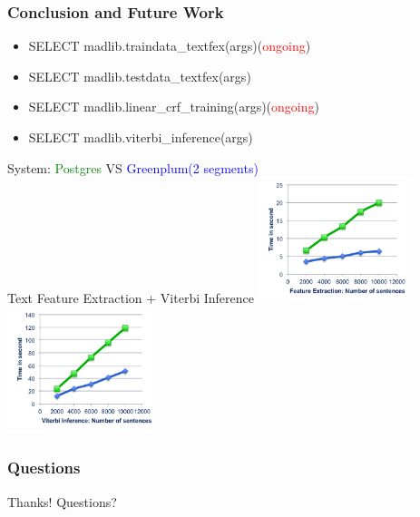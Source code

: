 \documentclass{beamer}
\begin{document}
\begin{frame}
  \frametitle{Conclusion and Future Work}

  \begin{itemize}
    \item SELECT madlib.traindata\_textfex(args)(\textcolor{red}{ongoing})
    \item SELECT madlib.testdata\_textfex(args)
    \item SELECT madlib.linear\_crf\_training(args)(\textcolor{red}{ongoing})
    \item SELECT madlib.viterbi\_inference(args)
  \end{itemize}
  System: \textcolor{green}{Postgres} VS \textcolor{blue}{Greenplum(2 segments)}\\
	  Text Feature Extraction + Viterbi Inference
	  \includegraphics[height=9.9em]{extraction.png}
	  \includegraphics[height=9.9em]{viterbi.png}
\end{frame}

\begin{frame}
  \frametitle{Questions}
  \begin{center}
   Thanks! Questions?
  \end{center}
\end{frame}
\end{document}
